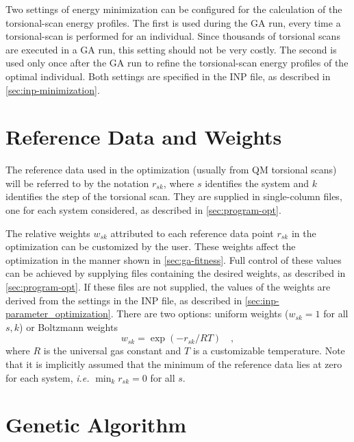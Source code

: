 \documentclass[10pt,a4paper]{report}
\numberwithin{equation}{section}
\begin{document}
Two settings of energy minimization can be configured for the calculation of the torsional-scan energy profiles.
The first is used during the GA run, every time a torsional-scan is performed for an individual.
Since thousands of torsional scans are executed in a GA run, this setting should not be very costly.
The second is used only once after the GA run to refine the torsional-scan energy profiles of the optimal individual. Both settings are specified in the INP file, as described in \autoref{sec:inp-minimization}.


\section{Reference Data and Weights}
\label{sec:ga-fitness-wei}

The reference data used in the optimization (usually from QM torsional
scans) will be referred to by the notation $r_{sk}$, where $s$
identifies the system and $k$ identifies the step of the torsional
scan.  They are supplied in single-column files, one for each system
considered, as described in \autoref{sec:program-opt}.

The relative weights $w_{sk}$ attributed to each reference data point
$r_{sk}$ in the optimization can be customized by the user.  These
weights affect the optimization in the manner shown in \autoref{sec:ga-fitness}.
Full control of these values can be achieved by
supplying files containing the desired weights, as described in
\autoref{sec:program-opt}. If these files are not supplied, the values
of the weights are derived from the settings in the INP file, as
described in \autoref{sec:inp-parameter_optimization}.  There are two
options: uniform weights ($w_{sk} = 1$ for all $s,k$) or Boltzmann
weights
\begin{equation*}
  w_{sk} = \exp{(-r_{sk}/RT)} \quad , 
\end{equation*}
where $R$ is the universal gas constant and $T$ is a customizable temperature.
Note that it is implicitly assumed that the minimum of the reference data
lies at zero for each system, \textit{i.e.} $\min_k{r_{sk}} = 0$ for all $s$.

\section{Genetic Algorithm}
\label{sec:ga}
\end{document}

